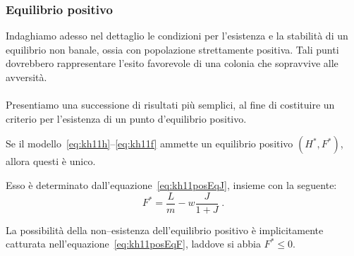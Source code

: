 \subsubsection{Equilibrio positivo}
Indaghiamo adesso nel dettaglio le condizioni per l'esistenza e la stabilità di un equilibrio non banale, ossia
con popolazione strettamente positiva. Tali punti dovrebbero rappresentare l'esito favorevole di una colonia che
sopravvive alle avversità.

\paragraph{}
Presentiamo una successione di risultati più semplici, al fine di costituire un criterio per l'esistenza di
un punto d'equilibrio positivo.

\begin{proposizione}
    Se il modello~\eqref{eq:kh11h}--\eqref{eq:kh11f} ammette un equilibrio positivo $(H^*, F^*)$, allora
    questi è unico.

    Esso è determinato dall'equazione~\eqref{eq:kh11posEqJ}, insieme con la seguente:
    \begin{equation}
        F^* = \frac{L}{m} - w \frac{J}{1+J} \; .
        \label{eq:kh11posEqF}
    \end{equation}

    \label{teo:exUniqFstarPos} %
\end{proposizione}

La possibilità della non--esistenza dell'equilibrio positivo è implicitamente
catturata nell'equazione~\eqref{eq:kh11posEqF}, laddove si abbia $F^* \leq 0$.

